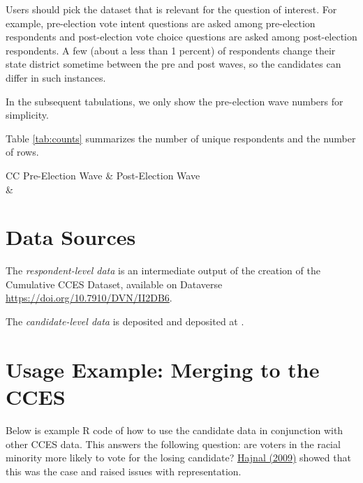 \documentclass[12pt]{article}
\begin{document}
Users should pick the dataset that is relevant for the question of interest. For example, pre-election vote intent questions are asked among pre-election respondents and post-election vote choice questions are asked among post-election respondents. A few (about a less than 1 percent) of respondents change their state district sometime between the pre and post waves, so the candidates can differ in such instances.  

In the subsequent tabulations, we only show the pre-election wave numbers for simplicity.

Table \ref{tab:counts} summarizes the number of unique respondents and the number of rows.

\begin{table}[!h]
\caption{\textbf{Summary of Counts} \label{tab:counts}}
\begin{tabularx}{\linewidth}{CC}
    Pre-Election Wave & Post-Election Wave\\
     & 
    \\
\end{tabularx}
\end{table}


\section{Data Sources}

The \emph{respondent-level data} is an intermediate output of the creation of the Cumulative CCES Dataset, available on Dataverse \url{https://doi.org/10.7910/DVN/II2DB6}.


The \emph{candidate-level data} is deposited and deposited at .

\FloatBarrier

\clearpage

\section{Usage Example: Merging to the CCES}

Below is example R code of how to use the candidate data in conjunction with other CCES data. This answers the following question: are voters in the racial minority more likely to vote for the losing candidate? \href{https://doi.org/10.1017/S0003055409090078}{Hajnal (2009)} showed that this was the case and raised issues with representation.
\end{document}
